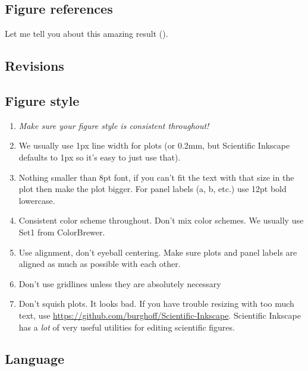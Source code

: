 \begin{refsegment}
\subsection*{Figure references}

Let me tell you about this amazing result
().

\subsection*{Revisions}


\subsection*{Figure style}

\begin{enumerate}
\item \textit{Make sure your figure style is consistent throughout!}
\item We usually use 1px line width for plots (or 0.2mm, but Scientific Inkscape
  defaults to 1px so it's easy to just use that).
\item Nothing smaller than 8pt font, if you can't fit the text with that size in
  the plot then make the plot bigger. For panel labels (a, b, etc.) use 12pt
  bold lowercase.
\item Consistent color scheme throughout. Don't mix color schemes. We usually
  use Set1 from ColorBrewer.
\item Use alignment, don't eyeball centering. Make sure plots and panel labels
  are aligned as much as possible with each other.
\item Don't use gridlines unless they are absolutely necessary
\item Don't squish plots. It looks bad. If you have trouble resizing with too
  much text, use \url{https://github.com/burghoff/Scientific-Inkscape}.
  Scientific Inkscape has a \textit{lot} of very useful utilities for editing
  scientific figures.
\end{enumerate}

\subsection*{Language}


\end{refsegment}
